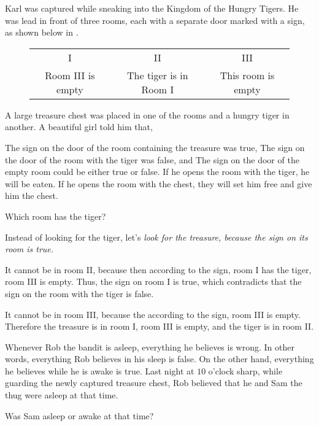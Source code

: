 \documentclass{article}
\begin{document}
\begin{exercise*}
    \label{exercise:pi-2022-4-p9}
    Karl was captured while sneaking into the Kingdom of the Hungry Tigers.
    He was lead in front of three rooms, each with a separate door marked with a sign,
    as shown below in .
    \begin{figure}[h]
        \centering
        \begin{tabular}{|c|c|c|}
        \hline
        I & II & III \\
        Room III is empty & The tiger is in Room I & This room is empty \\ \hline
        \end{tabular}
        \caption{}
        \label{fig:pi-2022-4-p9}
    \end{figure}
    A large treasure chest was placed in one of the rooms and a hungry tiger in another.
    A beautiful girl told him that,
    \begin{enumerate}[topsep=0pt, partopsep=0pt, itemsep=0pt]
        \ii The sign on the door of the room containing the treasure was true,
        \ii The sign on the door of the room with the tiger was false, and
        \ii The sign on the door of the empty room could be either true or false.
        \ii If he opens the room with the tiger, he will be eaten.
        \ii If he opens the room with the chest, they will set him free and give him the chest.
    \end{enumerate}

    Which room has the tiger?
\end{exercise*}

\begin{soln} 
    Instead of looking for the tiger, let's \textit{look for the treasure, because the sign on its room is true.}
    
    It cannot be in room II, because then according to the sign, room I has the tiger, room III is empty.
    Thus, the sign on room I is true, which contradicts that the sign on the room with the tiger is false.
    
    It cannot be in room III, because the according to the sign, room III is empty.
    Therefore the treasure is in room I, room III is empty, and the tiger is in room II.
\end{soln}

\begin{exercise*}
    \label{exercise:pi-2022-4-p12}
    Whenever Rob the bandit is asleep, everything he believes is wrong.
    In other words, everything Rob believes in his sleep is false.
    On the other hand, everything he believes while he is awake is true.
    Last night at $10$ o'clock sharp,
    while guarding the newly captured treasure chest,
    Rob believed that he and Sam the thug were asleep at that time.
    
    Was Sam asleep or awake at that time?
\end{exercise*}
\end{document}
